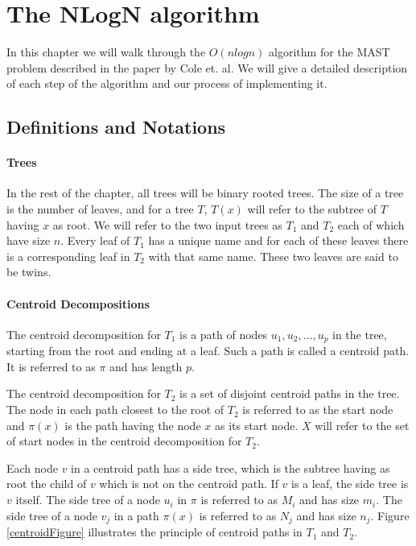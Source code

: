 \chapter{The NLogN algorithm}
In this chapter we will walk through the $O(nlogn)$ algorithm for the MAST problem described in the paper \cite{nlogn} by Cole et. al. We will give a detailed description of each step of the algorithm and our process of implementing it.

\section{Definitions and Notations}
\subsubsection{Trees}
In the rest of the chapter, all trees will be binary rooted trees. The size of a tree is the number of leaves, and for a tree $T$, $T(x)$ will refer to the subtree of $T$ having $x$ as root. We will refer to the two input trees as $T_1$ and $T_2$ each of which have size $n$. Every leaf of $T_1$ has a unique name and for each of these leaves there is a corresponding leaf in $T_2$ with that same name. These two leaves are said to be twins.

\subsubsection{Centroid Decompositions}
The centroid decomposition for $T_1$ is a path of nodes $u_1, u_2, ..., u_p$ in the tree, starting from the root and ending at a leaf. Such a path is called a centroid path. It is referred to as $\pi$ and has length $p$.

The centroid decomposition for $T_2$ is a set of disjoint centroid paths in the tree. The node in each path closest to the root of $T_2$ is referred to as the start node and $\pi(x)$ is the path having the node $x$ as its start node. $X$ will refer to the set of start nodes in the centroid decomposition for $T_2$.

Each node $v$ in a centroid path has a side tree, which is the subtree having as root the child of $v$ which is not on the centroid path. If $v$ is a leaf, the side tree is $v$ itself. The side tree of a node $u_i$ in $\pi$ is referred to as $M_i$ and has size $m_i$. The side tree of a node $v_j$ in a path $\pi(x)$ is referred to as $N_j$ and has size $n_j$. Figure \ref{centroidFigure} illustrates the principle of centroid paths in $T_1$ and $T_2$.

